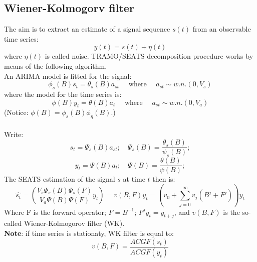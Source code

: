 \documentclass{article}
\begin{document}
\subsection*{Wiener-Kolmogorv filter}
 The aim is to extract an estimate of a signal sequence $s(t)$ from an observable time series:
 \begin{equation*}
 y(t)=s(t)+\eta(t)
 \end{equation*}
 where $\eta(t)$ is called noise. TRAMO/SEATS decomposition procedure works by means of the following algorithm.\\
An ARIMA model is fitted for the signal:
\begin{equation*}
\phi_{s}(B)s_{t}=\theta_{s}(B)a_{st} \quad \mbox{~where~} \quad a_{st} \sim w.n.(0,V_{s})
\end{equation*}
where the model for the time series is:
\begin{equation*}
\phi(B)y_{t}=\theta(B)a_{t} \quad \mbox{~where~} \quad a_{st}\sim w.n.(0,V_{a})
\end{equation*}
(Notice: $\phi(B)=\phi_{s}(B)\phi_{\eta}(B)$.)\\
\bigskip
\\
Write:
\begin{equation*}
s_{t}=\Psi_{s}(B)a_{st}; \quad \Psi_{s}(B)=\frac{\theta_{s}(B)}{\psi_{s}(B)} ;
\end{equation*}
\begin{equation*}
y_{t}=\Psi(B)a_{t}; \quad \Psi(B)=\frac{\theta(B)}{\psi(B)} ;
\end{equation*}
The SEATS estimation of the signal $s$ at time $t$ then is:
\begin{equation*}
\hat{s_{t}}=\left ( \frac {V_{s}\Psi_{s}(B)\Psi_{s}(F)}{V_{a}\Psi(B)\Psi(F)} y_{t}\right )=v(B,F)y_{t}=\left ( v_{0}+\sum\limits_{j=0}^\infty  v_{j} (B^{j}+F^{j}) \right) y_{t}
\end{equation*}
Where F is the forward operator; $F=B^{-1}$; $F^{j}y_{t}=y_{t+j}$, and $v(B,F)$ is the so-called Wiener-Kolmogorov filter (WK).\\\textbf{Note}: if time series is stationaty, WK filter is equal to:
\begin{equation*}
v(B,F)=\frac{ACGF(s_{t})}{ACGF(y_{t})}
\end{equation*}
\end{document}

